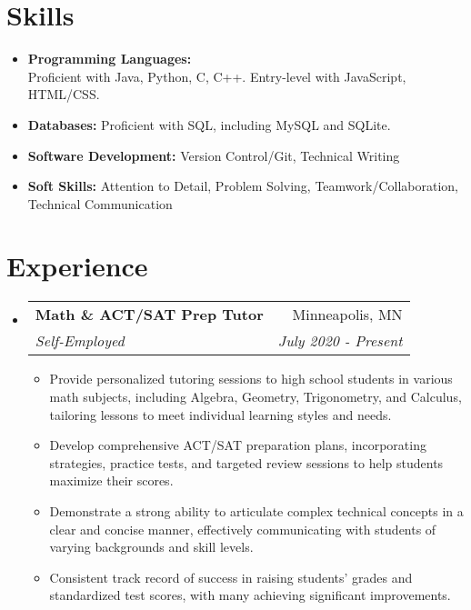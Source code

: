 \documentclass[letterpaper,11pt]{article}
\makeatletter
\newcommand{\resumeSubheading}[4]{
  \vspace{-1pt}\item
    \begin{tabular*}{0.97\textwidth}{l@{\extracolsep{\fill}}r}
      \textbf{#1} & #2 \\
      \textit{\small#3} & \textit{\small #4} \\
    \end{tabular*}\vspace{-5pt}
}
\newcommand{\projectItem}[1]{
  \item\small{
    {#1 \vspace{-2pt}}
  }
}
\newcommand{\resumeSubHeadingListStart}{\begin{itemize}[leftmargin=*]}
\newcommand{\resumeSubHeadingListEnd}{\end{itemize}}
\newcommand{\resumeItemListStart}{\begin{itemize}}
\newcommand{\resumeItemListEnd}{\end{itemize}\vspace{-5pt}}
\makeatother
\begin{document}
\section{Skills}
 \resumeSubHeadingListStart
   \item{
     \textbf{Programming Languages:}\\{Proficient with Java, Python, C, C++. Entry-level with JavaScript, HTML/CSS.} \\ \vspace{-5pt}
   }
   \item{
     \textbf{Databases:}{ Proficient with SQL, including MySQL and SQLite.} \\ \vspace{-5pt}
     
   }
   \item{
     \textbf{Software Development:}{ Version Control/Git, Technical Writing} \\ \vspace{-5pt}
     
   }
   \item{
     \textbf{Soft Skills:}{ Attention to Detail, Problem Solving, Teamwork/Collaboration, Technical Communication} \\ \vspace{-5pt}
     
   }   
   
 \resumeSubHeadingListEnd

\section{Experience}
  \resumeSubHeadingListStart
    \resumeSubheading
      {Math \& ACT/SAT Prep Tutor}{Minneapolis, MN}
      {Self-Employed}{July 2020 - Present}
      \resumeItemListStart
        \projectItem
          {Provide personalized tutoring sessions to high school students in various math subjects, including Algebra, Geometry, Trigonometry, and Calculus, tailoring lessons to meet individual learning styles and needs.}
        \projectItem
          {Develop comprehensive ACT/SAT preparation plans, incorporating strategies, practice tests, and targeted review sessions to help students maximize their scores.}
        \projectItem
          {Demonstrate a strong ability to articulate complex technical concepts in a clear and concise manner, effectively communicating with students of varying backgrounds and skill levels.}
        \projectItem
          {Consistent track record of success in raising students' grades and standardized test scores, with many achieving significant improvements.}
      \resumeItemListEnd \vspace{-5pt}
  \resumeSubHeadingListEnd 
\end{document}
